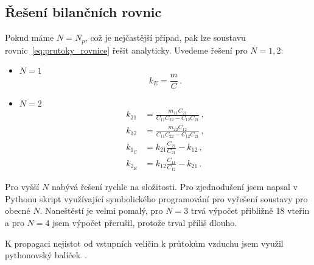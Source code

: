\subsection{Řešení bilančních rovnic}
Pokud máme $N=N_p$, což je nejčastější případ, pak lze soustavu rovnic~\eqref{eq:prutoky_rovnice} řešit analyticky. Uvedeme řešení pro $N=1, 2$:
\begin{itemize}
    \item $N=1$
        \begin{equation}
            k_E=\frac{m}{C}\,.
        \end{equation}
    \item $N=2$
        \begin{align}
            k_{21}&=\frac{m_{11}C_{21}}{C_{11}C_{22}-C_{12}C_{21}}\,, \\
            k_{12}&=\frac{m_{22}C_{12}}{C_{11}C_{22}-C_{12}C_{21}}\,, \\
            k_{1_E}&=k_{21}\frac{C_{22}}{C_{21}}-k_{12}\,,\\
            k_{2_E}&=k_{12}\frac{C_{11}}{C_{12}}-k_{21}\,.
        \end{align}
\end{itemize}
Pro vyšší $N$ nabývá řešení rychle na složitosti. Pro zjednodušení jsem napsal v Pythonu skript využívající symbolického programování pro vyřešení soustavy pro obecné $N$. Naneštěstí je velmi pomalý, pro $N=3$ trvá výpočet přibližně 18 vteřin a pro $N=4$ jsem výpočet přerušil, protože trval příliš dlouho.

K propagaci nejistot od vstupních veličin k průtokům vzduchu jsem využil pythonovský balíček~\cite{uncertainties}.
